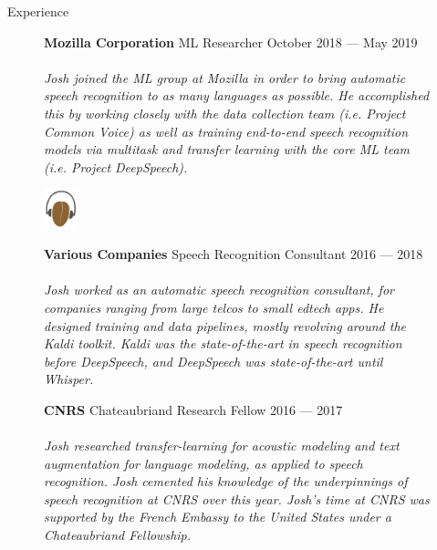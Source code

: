 \documentclass{resume} %
\begin{document}
\begin{rSection}{Experience}
  \begin{figure}[H]
    \begin{minipage}{0.2\textwidth}
      \centering
      
    \end{minipage}
    \begin{minipage}{0.8\textwidth}
      {\bf Mozilla Corporation} \hfill ML Researcher \hfill {October 2018 --- May 2019} \\ \\
      \textit{Josh joined the ML group at Mozilla in order to bring automatic speech recognition to as many languages as possible. He accomplished this by working closely with the data collection team (i.e. Project Common Voice) as well as training end-to-end speech recognition models via multitask and transfer learning with the core ML team (i.e. Project DeepSpeech).} \\
    \end{minipage}
  \end{figure}

  \begin{figure}[H]
    \begin{minipage}{0.2\textwidth}
      \centering
      \includegraphics[width=1cm]{imgs/kaldi-logo.png}
    \end{minipage}
    \begin{minipage}{0.8\textwidth}
      {\bf Various Companies} \hfill Speech Recognition Consultant \hfill {2016 --- 2018} \\ \\
      \textit{Josh worked as an automatic speech recognition consultant, for companies ranging from large telcos to small edtech apps. He designed training and data pipelines, mostly revolving around the Kaldi toolkit. Kaldi was the state-of-the-art in speech recognition before DeepSpeech, and DeepSpeech was state-of-the-art until Whisper.} \\
    \end{minipage}
  \end{figure}

  \begin{figure}[H]
    \begin{minipage}{0.2\textwidth}
      \centering
      
    \end{minipage}
    \begin{minipage}{0.8\textwidth}
      {\bf CNRS} \hfill Chateaubriand Research Fellow  \hfill {2016 --- 2017} \\ \\
      \textit{Josh researched transfer-learning for acoustic modeling and text augmentation for language modeling, as applied to speech recognition. Josh cemented his knowledge of the underpinnings of speech recognition at CNRS over this year. Josh's time at CNRS was supported by the French Embassy to the United States under a Chateaubriand Fellowship.}
    \end{minipage}
  \end{figure}


\end{rSection}
\end{document}
